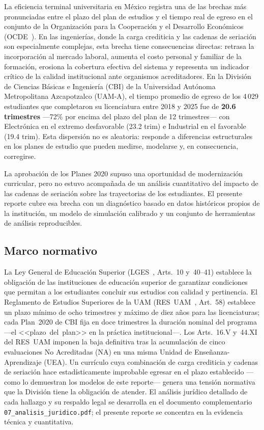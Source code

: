 \documentclass[11pt,letterpaper]{article}
\begin{document}
La eficiencia terminal universitaria en México registra una de las brechas
más pronunciadas entre el plazo del plan de estudios y el tiempo real de egreso en el
conjunto de la Organización para la Cooperación y el Desarrollo Económicos (OCDE~\cite{OCDE2024}).
En las ingenierías, donde la carga crediticia y las cadenas de seriación
son especialmente complejas, esta brecha tiene consecuencias directas: retrasa
la incorporación al mercado laboral, aumenta el costo personal y familiar de
la formación, erosiona la cobertura efectiva del sistema y representa un
indicador crítico de la calidad institucional ante organismos acreditadores.
En la División de Ciencias Básicas e Ingeniería (CBI) de la Universidad Autónoma Metropolitana Azcapotzalco (UAM-A), el tiempo promedio de egreso de
los 4\,029 estudiantes que completaron su licenciatura entre 2018 y 2025 fue
de \textbf{20.6 trimestres} ---72\% por encima del plazo del plan de
12 trimestres--- con Electrónica en el extremo desfavorable (23.2 trim) e
Industrial en el favorable (19.4 trim).
Esta dispersión no es aleatoria: responde a diferencias estructurales en los
planes de estudio que pueden medirse, modelarse y, en consecuencia, corregirse.

La aprobación de los Planes 2020 supuso una oportunidad de modernización
curricular, pero no estuvo acompañada de un análisis cuantitativo del impacto
de las cadenas de seriación sobre las trayectorias de los estudiantes.
El presente reporte cubre esa brecha con un diagnóstico basado en datos
históricos propios de la institución, un modelo de simulación calibrado y
un conjunto de herramientas de análisis reproducibles.

\subsection{Marco normativo}

La Ley General de Educación Superior (LGES~\cite{LGES2021}, Arts.~10 y~40--41) establece
la obligación de las instituciones de educación superior de garantizar
condiciones que permitan a los estudiantes concluir sus estudios con calidad
y pertinencia.
El Reglamento de Estudios Superiores de la UAM (RES~UAM~\cite{RESUAM}, Art.~58)
establece un plazo mínimo de ocho trimestres y máximo de diez años para las
licenciaturas; cada Plan~2020 de CBI fija en doce trimestres la duración nominal
del programa ---el \mbox{<<plazo del plan>>} en la práctica institucional---.
Los Arts.~16.V y~44.XI del RES~UAM imponen la baja definitiva tras la acumulación
de cinco evaluaciones No Acreditadas (NA) en una misma Unidad de Enseñanza-Aprendizaje (UEA).
Un currículo cuya combinación de carga crediticia y cadenas de seriación
hace estadísticamente improbable egresar en el plazo establecido
---como lo demuestran los modelos de este reporte--- genera una tensión
normativa que la División tiene la obligación de atender.
El análisis jurídico detallado de cada hallazgo y su respaldo legal se
desarrolla en el documento complementario \texttt{07\_analisis\_juridico.pdf};
el presente reporte se concentra en la evidencia técnica y cuantitativa.
\end{document}
